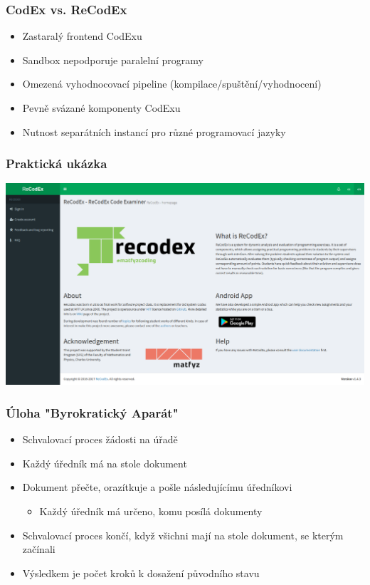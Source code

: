 \documentclass{beamer}
\begin{document}
\begin{frame}
	\frametitle{CodEx vs. ReCodEx}
	\begin{itemize}
		\item Zastaralý frontend CodExu
		\item Sandbox nepodporuje paralelní programy
		\item Omezená vyhodnocovací pipeline (kompilace/spuštění/vyhodnocení)
		\item Pevně svázané komponenty CodExu
		\item Nutnost separátních instancí pro různé programovací jazyky
	\end{itemize}
\end{frame}

\begin{frame}
	\frametitle{Praktická ukázka}
	\begin{center}
		\includegraphics[width=1\textwidth]{images/recodex-screen.png}
	\end{center}
\end{frame}

\begin{frame}
	\frametitle{Úloha "Byrokratický Aparát"}
	\begin{itemize}
		\item Schvalovací proces žádosti na úřadě
		\item Každý úředník má na stole dokument
		\item Dokument přečte, orazítkuje a pošle následujícímu úředníkovi
		\begin{itemize}
			\item Každý úředník má určeno, komu posílá dokumenty
		\end{itemize}
		\item Schvalovací proces končí, když všichni mají na stole dokument, se kterým začínali
		\item Výsledkem je počet kroků k dosažení původního stavu
	\end{itemize}
\end{frame}
\end{document}
